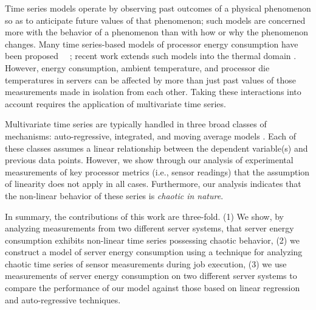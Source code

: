 \documentclass[times,10pt,finalversion]{usetex-v1}
\begin{document}
Time series models operate by observing past outcomes of a physical
phenomenon so as to anticipate future values of that phenomenon; such models
are concerned more with the behavior of a phenomenon than
with how or why the phenomenon changes.  Many time series-based models
of processor energy consumption have been proposed
\cite{Rivoire2008}~\cite{Bhattacharjee2009}~\cite{Reich2010}; recent
work extends such models into the thermal domain \cite{Coskun2008}.
However, energy consumption, ambient temperature, and processor die
temperatures in servers can be affected by more than just past values
of those measurements made in isolation from each other.  Taking these
interactions into account requires the application of multivariate time
series.

Multivariate time series are typically handled in three broad classes of
mechanisms: auto-regressive, integrated, and moving average models
\cite{Box1994}.  Each of these classes assumes a linear relationship
between the dependent variable(s) and previous data points.  However, we
show through our analysis of experimental measurements of key processor
metrics (i.e., sensor readings) that the assumption of linearity does not
apply in all cases. Furthermore, our analysis indicates that the
non-linear behavior of these series is \textit{chaotic in nature}.

In summary, the contributions of this work are three-fold. (1) We show, by
analyzing measurements from two different server systems, that server
energy consumption exhibits non-linear time series possessing chaotic
behavior, (2) we construct a model of server energy consumption using a
technique for analyzing chaotic time series of sensor measurements
during job execution, (3) we use measurements of server energy
consumption on two different server systems to compare the performance
of our model against those based on linear regression and
auto-regressive techniques.
\end{document}
